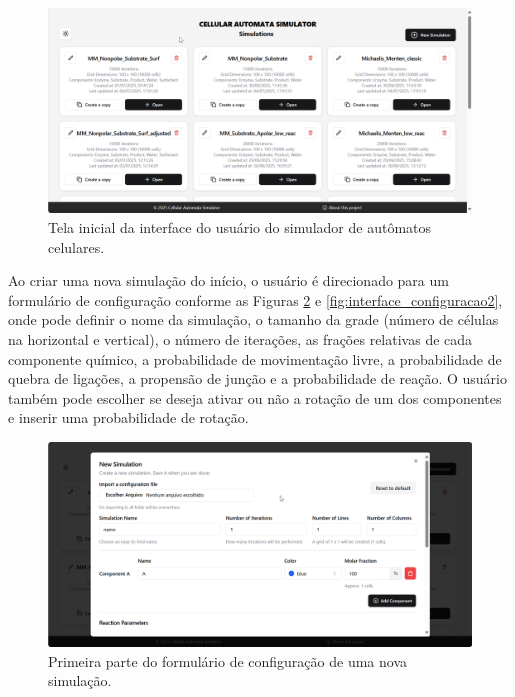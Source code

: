 \documentclass[12pt,oneside]{report}
\begin{document}
\begin{figure}[H]
    \centering
    \includegraphics[width=1\textwidth]{img/interface_inicial.png}
    \caption{\small Tela inicial da interface do usuário do simulador de autômatos celulares.}
    \label{fig:interface_inicial}
\end{figure}

Ao criar uma nova simulação do início, o usuário é direcionado para um formulário de configuração conforme as Figuras \ref{fig:interface_configuracao1} e \ref{fig:interface_configuracao2}, onde pode definir o nome da simulação, o tamanho da grade (número de células na horizontal e vertical), o número de iterações, as frações relativas de cada componente químico, a probabilidade de movimentação livre, a probabilidade de quebra de ligações, a propensão de junção e a probabilidade de reação. O usuário também pode escolher se deseja ativar ou não a rotação de um dos componentes e inserir uma probabilidade de rotação.

\begin{figure}[H]
    \centering
    \includegraphics[width=1\textwidth]{img/interface_configuracao.png}
    \caption{\small Primeira parte do formulário de configuração de uma nova simulação.}
    \label{fig:interface_configuracao1}
\end{figure}
\end{document}
